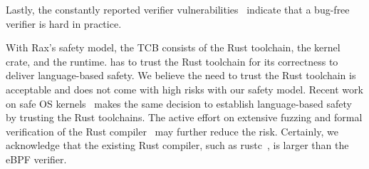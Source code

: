 Lastly, the constantly reported verifier vulnerabilities~\cite{untenableVerification,ebpf-stackoverflow,ebpf-termination}
    indicate that a bug-free verifier is hard in practice.








%

With Rax's safety model, the TCB consists of the Rust toolchain, the
    \projname{} kernel crate, and the \projname{} runtime.
\projname{} has to trust the Rust toolchain for its correctness to deliver
    language-based safety.
We believe the need to trust the Rust toolchain is acceptable
    and does not come with high risks with our safety model.
Recent work on safe OS kernels~\cite{theseus,redleaf,Miller-hotos19} makes the same decision
    to establish language-based safety by trusting the Rust toolchains.
The active effort on extensive fuzzing and formal verification of the Rust
    compiler~\cite{rust-belt,stacked-borrows-popl19,verus,verus-sosp24,rvt,rustc-fuzzing}
    may further reduce the risk.
Certainly, we acknowledge that the existing Rust compiler, such as rustc~\cite{rustc},
    is larger than the eBPF verifier.

